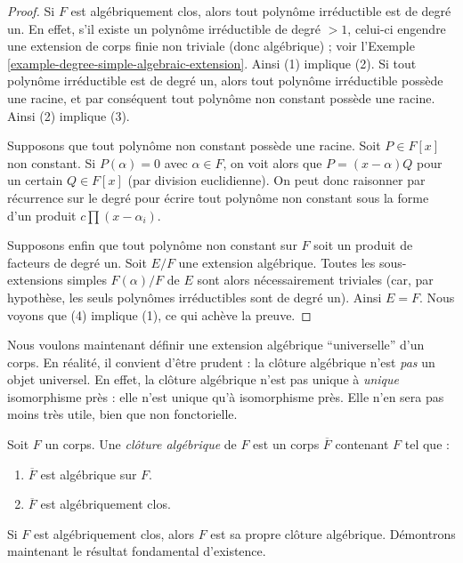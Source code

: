 \begin{proof}
Si $F$ est algébriquement clos, alors tout polynôme irréductible est de degré un.
En effet, s'il existe un polynôme irréductible de degré $> 1$, celui-ci
engendre une extension de corps finie non triviale (donc algébrique) ; voir
l'Exemple \ref{example-degree-simple-algebraic-extension}.
Ainsi (1) implique (2). Si tout polynôme irréductible
est de degré un, alors tout polynôme irréductible possède une racine, et par conséquent tout
polynôme non constant possède une racine. Ainsi (2) implique (3).

\medskip\noindent
Supposons que tout polynôme non constant possède une racine. Soit $P \in F[x]$
non constant. Si $P(\alpha) = 0$ avec $\alpha \in F$, on voit alors
que $P = (x - \alpha)Q$ pour un certain $Q \in F[x]$ (par division euclidienne).
On peut donc raisonner par récurrence sur le degré pour écrire tout polynôme non constant
sous la forme d'un produit $c \prod (x - \alpha_i)$.

\medskip\noindent
Supposons enfin que tout polynôme non constant sur $F$ soit un produit de
facteurs de degré un. Soit $E/F$ une extension algébrique. Toutes les sous-extensions
simples $F(\alpha)/F$ de $E$ sont alors nécessairement triviales (car, par
hypothèse, les seuls polynômes irréductibles sont de degré un). Ainsi $E = F$.
Nous voyons que (4) implique (1), ce qui achève la preuve.
\end{proof}

\noindent
Nous voulons maintenant définir une extension algébrique ``universelle'' d'un corps.
En réalité, il convient d'être prudent : la clôture algébrique n'est {\it pas} un
objet universel. En effet, la clôture algébrique n'est pas unique à
{\it unique} isomorphisme près : elle n'est unique qu'à isomorphisme près. Elle
n'en sera pas moins très utile, bien que non fonctorielle.

\begin{definition}
\label{definition-algebraic-closure}
Soit $F$ un corps. Une {\it clôture algébrique} de $F$ est un corps
$\overline{F}$ contenant $F$ tel que :
\begin{enumerate}
\item $\overline{F}$ est algébrique sur $F$.
\item $\overline{F}$ est algébriquement clos.
\end{enumerate}
\end{definition}

\noindent
Si $F$ est algébriquement clos, alors $F$ est sa propre clôture algébrique.
Démontrons maintenant le résultat fondamental d'existence.

